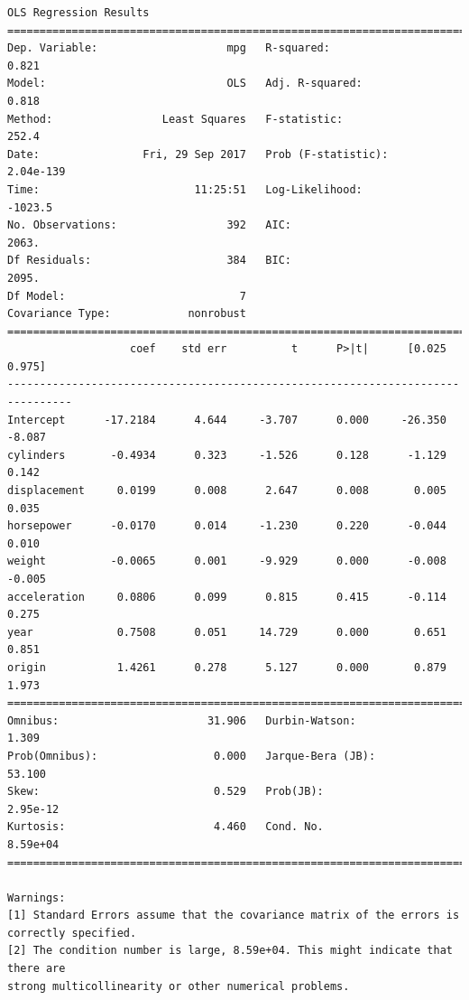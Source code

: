 \documentclass[11pt]{article}
\begin{document}
    \begin{Verbatim}[commandchars=\\\{\}]
                            OLS Regression Results                            
==============================================================================
Dep. Variable:                    mpg   R-squared:                       0.821
Model:                            OLS   Adj. R-squared:                  0.818
Method:                 Least Squares   F-statistic:                     252.4
Date:                Fri, 29 Sep 2017   Prob (F-statistic):          2.04e-139
Time:                        11:25:51   Log-Likelihood:                -1023.5
No. Observations:                 392   AIC:                             2063.
Df Residuals:                     384   BIC:                             2095.
Df Model:                           7                                         
Covariance Type:            nonrobust                                         
================================================================================
                   coef    std err          t      P>|t|      [0.025      0.975]
--------------------------------------------------------------------------------
Intercept      -17.2184      4.644     -3.707      0.000     -26.350      -8.087
cylinders       -0.4934      0.323     -1.526      0.128      -1.129       0.142
displacement     0.0199      0.008      2.647      0.008       0.005       0.035
horsepower      -0.0170      0.014     -1.230      0.220      -0.044       0.010
weight          -0.0065      0.001     -9.929      0.000      -0.008      -0.005
acceleration     0.0806      0.099      0.815      0.415      -0.114       0.275
year             0.7508      0.051     14.729      0.000       0.651       0.851
origin           1.4261      0.278      5.127      0.000       0.879       1.973
==============================================================================
Omnibus:                       31.906   Durbin-Watson:                   1.309
Prob(Omnibus):                  0.000   Jarque-Bera (JB):               53.100
Skew:                           0.529   Prob(JB):                     2.95e-12
Kurtosis:                       4.460   Cond. No.                     8.59e+04
==============================================================================

Warnings:
[1] Standard Errors assume that the covariance matrix of the errors is correctly specified.
[2] The condition number is large, 8.59e+04. This might indicate that there are
strong multicollinearity or other numerical problems.

    \end{Verbatim}
\end{document}
